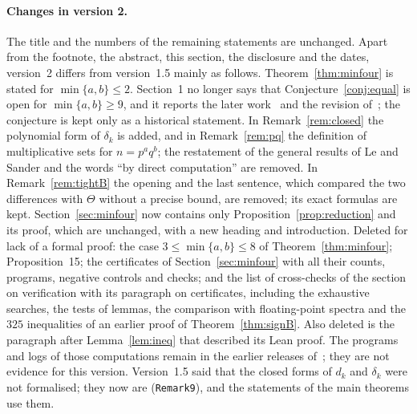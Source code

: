 \documentclass[11pt]{article}
\theoremstyle{remark}
\begin{document}
\paragraph{Changes in version 2.}
The title and the numbers of the remaining statements are unchanged. Apart from the
footnote, the abstract, this section, the disclosure and the dates, version~2 differs
from version~1.5 mainly as follows. Theorem~\ref{thm:minfour} is stated for
$\min\{a,b\}\le2$. Section~1 no longer says that Conjecture~\ref{conj:equal} is open
for $\min\{a,b\}\ge9$, and it reports the later work~\cite{jy2,tru2} and the revision
of~\cite{jy}; the conjecture is kept only as a historical statement. In
Remark~\ref{rem:closed} the polynomial form of $\delta_k$ is added, and in
Remark~\ref{rem:pq} the definition of multiplicative sets for $n=p^aq^b$; the
restatement of the general results of Le and Sander and the words ``by direct
computation'' are removed. In Remark~\ref{rem:tightB} the opening and the last
sentence, which compared the two differences with $\Theta$ without a precise bound,
are removed; its exact formulas are kept. Section~\ref{sec:minfour} now contains only
Proposition~\ref{prop:reduction} and its proof, which are unchanged, with a new
heading and introduction. Deleted for lack of a formal proof: the case
$3\le\min\{a,b\}\le8$ of Theorem~\ref{thm:minfour}; Proposition~15; the
certificates of Section~\ref{sec:minfour} with all their counts, programs, negative
controls and checks; and the list of cross-checks of the section on verification with
its paragraph on certificates, including the exhaustive searches, the tests of
lemmas, the comparison with floating-point spectra and the $325$ inequalities of an
earlier proof of Theorem~\ref{thm:signB}. Also deleted is the paragraph after
Lemma~\ref{lem:ineq} that described its Lean proof. The programs and logs of those
computations remain in the earlier releases of~\cite{repo}; they are not evidence for
this version. Version~1.5 said that the closed forms of $d_k$ and $\delta_k$ were not
formalised; they now are (\texttt{Remark9}), and the statements of the main theorems
use them.
\end{document}
